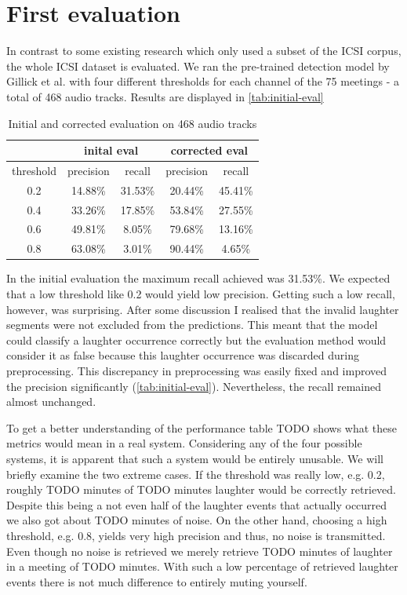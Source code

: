 \documentclass[bsc,frontabs,parskip,deptreport]{infthesis}
\begin{document}
\section{First evaluation}
In contrast to some existing research \citep{kennedy2004laughter, knox2006automatic} which only used a subset of the ICSI corpus, the whole ICSI dataset is evaluated. 
We ran the pre-trained detection model by Gillick et al. with four different thresholds for each channel of the 75 meetings - a total of 468 audio tracks. 
Results are displayed in \autoref{tab:initial-eval}

\begin{table}[]
    \centering
    \begin{tabular}{|c|c|c|c|c|}
    \hline
    & \multicolumn{2}{|c|}{inital eval} & \multicolumn{2}{|c|}{corrected eval} \\
    \hline 
    threshold & precision & recall & precision & recall \\
    \hline
        0.2 &  14.88\% & 31.53\% & 20.44\% & 45.41\% \\
        0.4 &  33.26\% & 17.85\% & 53.84\% & 27.55\% \\
        0.6 &  49.81\% & 8.05\% & 79.68\% & 13.16\% \\
        0.8 &  63.08\% & 3.01\% & 90.44\% & 4.65\% \\
     \hline
    \end{tabular}
    \caption{Initial and corrected evaluation on 468 audio tracks}
    \label{tab:initial-eval}
\end{table}

In the initial evaluation the maximum recall achieved was 31.53\%. We expected that a low threshold like 0.2 would yield low precision. Getting such a low recall, however, was surprising. 
After some discussion I realised that the invalid laughter segments were not excluded from the predictions. This meant that the model could classify a laughter occurrence correctly but the evaluation method would consider it as false because this laughter occurrence was discarded during preprocessing. This discrepancy in preprocessing was easily fixed and improved the precision significantly (\autoref{tab:initial-eval}). Nevertheless, the recall remained almost unchanged. 

To get a better understanding of the performance table TODO shows what these metrics would mean in a real system. 
Considering any of the four possible systems, it is apparent that such a system would be entirely unusable. We will briefly examine the two extreme cases. If the threshold was really low, e.g. 0.2, roughly TODO minutes of TODO minutes laughter would be correctly retrieved. Despite this being a not even half of the laughter events that actually occurred we also got about TODO minutes of noise.  
On the other hand, choosing a high threshold, e.g. 0.8, yields very high precision and thus, no noise is transmitted. Even though no noise is retrieved we merely retrieve TODO minutes of laughter in a meeting of TODO minutes. With such a low percentage of retrieved laughter events there is not much difference to entirely muting yourself. 
\end{document}
